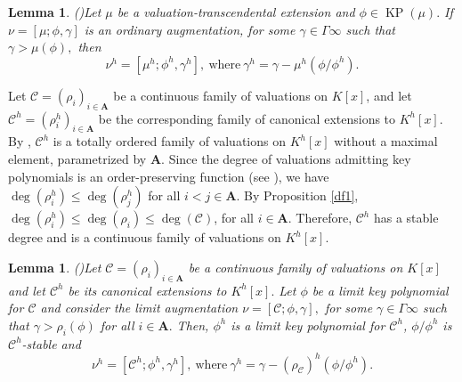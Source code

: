 \documentclass[11pt]{amsart}
\newtheorem{lemma}[theorem]{Lemma}
\theoremstyle{definition}
\theoremstyle{remark}
\numberwithin{equation}{section}
\begin{document}
\begin{lemma}(\cite[Lemma 5.7]{EN3})\label{df2}
Let $\mu$ be a valuation-transcendental extension and $\phi\in \operatorname{KP}(\mu).$ If $\nu=[\mu;\phi,\gamma]$ is an ordinary augmentation, for some $\gamma\in\Gamma\infty$ such that $\gamma>\mu(\phi),$ then \[\nu^h=[\mu^h;
\phi^h,\gamma^h], \ \text{where}\ \gamma^h=\gamma-\mu^h(\phi/\phi^h).\]
\end{lemma}

Let $\mathcal{C}=(\rho_i)_{i\in\mathbf{A}}$ be a continuous family of valuations on $K[x]$, and let $\mathcal{C}^h=(\rho_i^h)_{i\in\mathbf{A}}$ be the corresponding family of canonical extensions to $K^h[x]$. By \cite[Theorem A]{EN5}, $\mathcal{C}^h$ is a totally ordered family of valuations on $K^h[x]$ without a maximal element, parametrized by $\mathbf{A}$. Since the degree of valuations admitting key polynomials is an order-preserving function (see \cite[Lemma 2.2]{Ma2}), we have $\deg(\rho_i^h)\leq \deg(\rho_j^h)$ for all $i<j\in\mathbf{A}$.  By Proposition \ref{df1}, $\deg(\rho_i^h)\leq\deg(\rho_i)\leq \deg(\mathcal{C})$, for all $i\in \mathbf{A}$. Therefore, $\mathcal{C}^h$ has a stable degree and is a continuous family of valuations on $K^h[x]$.


\begin{lemma}(\cite[Lemma 5.13]{EN3})\label{df3}
Let $\mathcal{C}  =(\rho_i)_{i\in\mathbf{A}}$ be a continuous family of valuations on $K[x]$ and let $\mathcal{C}^h$ be its canonical extensions to $K^h[x].$ Let $\phi$ be a limit key polynomial for $\mathcal{C}$ and consider the limit augmentation $\nu=[\mathcal{C};\phi,\gamma],$ for some $\gamma\in\Gamma\infty$ such that $\gamma>\rho_i(\phi)$ for all $i\in\mathbf{A}.$ Then, $\phi^h$ is a limit key polynomial for $\mathcal{C}^h$, $\phi/\phi^h$ is $\mathcal{C}^h$-stable and 
\[\nu^h=[\mathcal{C}^h;\phi^h,\gamma^h], \ \text{where}\ \gamma^h=\gamma-(\rho_{\mathcal{C}})^h(\phi/\phi^h).\]
\end{lemma}
\end{document}
